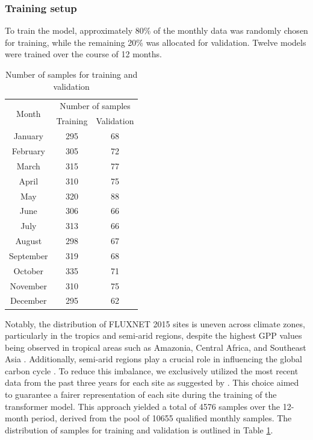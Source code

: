 \subsubsection{Training setup}
To train the model, approximately 80\% of the monthly data was randomly chosen for training, while the remaining 20\% was allocated for validation. Twelve models were trained over the course of 12 months. \par
\begin{table}[!ht]
    \centering
    \caption{Number of samples for training and validation}
    \begin{tabular}{ccc}
        \hline
        \multirow{2}{*}{Month} & \multicolumn{2}{c}{Number of samples} \\ \cline{2-3}
        ~ & Training & Validation \\ \hline
        January & 295 & 68 \\ 
        February & 305 & 72 \\ 
        March & 315 & 77 \\ 
        April & 310 & 75 \\ 
        May & 320 & 88 \\ 
        June & 306 & 66 \\ 
        July & 313 & 66 \\ 
        August & 298 & 67 \\ 
        September & 319 & 68 \\ 
        October & 335 & 71 \\ 
        November & 310 & 75 \\ 
        December & 295 & 62 \\ \hline
    \end{tabular}
    \label{tab:chap6_nosamples}
\end{table}

Notably, the distribution of FLUXNET 2015 sites is uneven across climate zones, particularly in the tropics and semi-arid regions, despite the highest GPP values being observed in tropical areas such as Amazonia, Central Africa, and Southeast Asia \citep{chen2017regional}. Additionally, semi-arid regions play a crucial role in influencing the global carbon cycle \citep{poulter2014contribution}. To reduce this imbalance, we exclusively utilized the most recent data from the past three years for each site as suggested by \citep{zeng2020global}. This choice aimed to guarantee a fairer representation of each site during the training of the transformer model. This approach yielded a total of 4576 samples over the 12-month period, derived from the pool of 10655 qualified monthly samples. The distribution of samples for training and validation is outlined in Table \ref{tab:chap6_nosamples}. \par
